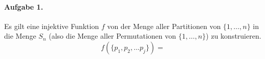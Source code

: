 \documentclass{article}
\begin{document}
\paragraph{Aufgabe 1.}

Es gilt eine injektive Funktion $f$ von der Menge aller Partitionen von $\{ 1, \ldots, n \}$ in die Menge $S_n$ (also die Menge aller Permutationen von $\{ 1, \ldots, n \}$) zu konstruieren.
\begin{equation*}
    f(\{ p_1, p_2, \ldots p_j \}) = 
\end{equation*}


\end{document}
